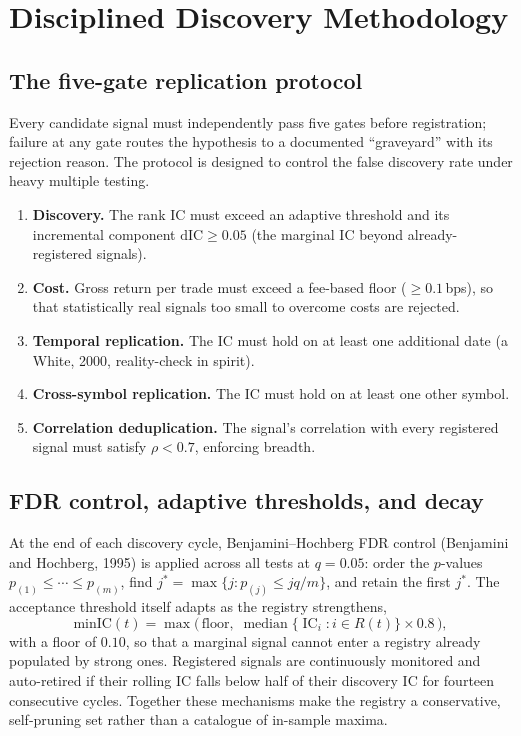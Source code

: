 \documentclass[11pt,a4paper]{article}
\theoremstyle{definition}
\theoremstyle{plain}
\newcommand{\med}{\operatorname{median}}
\DeclareMathOperator{\IC}{IC}
\begin{document}
\section{Disciplined Discovery Methodology}
\label{sec:methodology}

\subsection{The five-gate replication protocol}

Every candidate signal must independently pass five gates before registration; failure at any
gate routes the hypothesis to a documented ``graveyard'' with its rejection reason. The protocol
is designed to control the false discovery rate under heavy multiple testing.

\begin{enumerate}
  \item[\textbf{G1}] \textbf{Discovery.} The rank IC must exceed an adaptive threshold and its
        incremental component $\mathrm{dIC}\geq 0.05$ (the marginal IC beyond already-registered
        signals).
  \item[\textbf{G2}] \textbf{Cost.} Gross return per trade must exceed a fee-based floor
        ($\geq 0.1$\,bps), so that statistically real signals too small to overcome costs are
        rejected.
  \item[\textbf{G3}] \textbf{Temporal replication.} The IC must hold on at least one additional
        date (a White, 2000, reality-check in spirit).
  \item[\textbf{G4}] \textbf{Cross-symbol replication.} The IC must hold on at least one other
        symbol.
  \item[\textbf{G5}] \textbf{Correlation deduplication.} The signal's correlation with every
        registered signal must satisfy $\rho < 0.7$, enforcing breadth.
\end{enumerate}

\subsection{FDR control, adaptive thresholds, and decay}

At the end of each discovery cycle, Benjamini--Hochberg FDR control (Benjamini and Hochberg, 1995)
is applied across all tests at $q=0.05$: order the $p$-values
$p_{(1)}\leq\cdots\leq p_{(m)}$, find $j^*=\max\{j: p_{(j)}\leq jq/m\}$, and retain the first
$j^*$. The acceptance threshold itself adapts as the registry strengthens,
\begin{equation}
  \mathrm{minIC}(t) = \max\!\Big(\,\text{floor},\;
  \med\{\IC_i : i\in R(t)\}\times 0.8\,\Big),
  \label{eq:adaptive}
\end{equation}
with a floor of $0.10$, so that a marginal signal cannot enter a registry already populated by
strong ones. Registered signals are continuously monitored and auto-retired if their rolling IC
falls below half of their discovery IC for fourteen consecutive cycles. Together these mechanisms
make the registry a conservative, self-pruning set rather than a catalogue of in-sample maxima.
\end{document}
